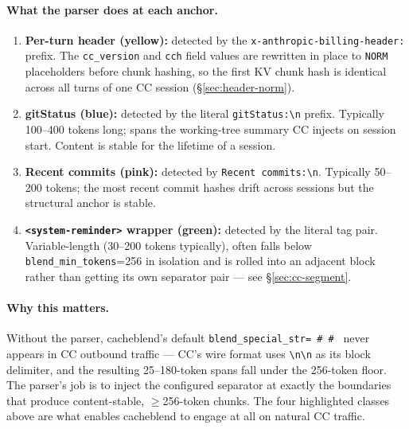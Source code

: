 \paragraph{What the parser does at each anchor.}
\begin{enumerate}
\item \textbf{Per-turn header (yellow):} detected by the
  \texttt{x-anthropic-\allowbreak{}billing-\allowbreak{}header:}
  prefix. The \texttt{cc\_version} and \texttt{cch} field values
  are rewritten
  in place to \texttt{NORM} placeholders before chunk hashing, so
  the first KV chunk hash is identical across all turns of one CC
  session (\S\ref{sec:header-norm}).
\item \textbf{gitStatus (blue):} detected by the literal
  \texttt{gitStatus:\textbackslash{}n} prefix. Typically 100--400
  tokens long; spans the working-tree summary CC injects on session
  start. Content is stable for the lifetime of a session.
\item \textbf{Recent commits (pink):} detected by
  \texttt{Recent commits:\textbackslash{}n}. Typically 50--200
  tokens; the most recent commit hashes drift across sessions but
  the structural anchor is stable.
\item \textbf{\texttt{<system-reminder>} wrapper (green):} detected
  by the literal tag pair. Variable-length (30--200 tokens
  typically), often falls below
  \texttt{blend\_min\_tokens}=256 in isolation and is rolled into
  an adjacent block rather than getting its own separator pair ---
  see \S\ref{sec:cc-segment}.
\end{enumerate}

\paragraph{Why this matters.} Without the parser, cacheblend's
default \texttt{blend\_special\_str=\textquotedbl{}~\#~\#~\textquotedbl{}}
never appears in CC outbound traffic --- CC's wire format uses
\texttt{\textbackslash{}n\textbackslash{}n} as its block delimiter,
and the resulting 25--180-token spans fall under the 256-token
floor. The parser's job is to inject the configured separator at
exactly the boundaries that produce content-stable, $\geq$256-token
chunks. The four highlighted classes above are what enables
cacheblend to engage at all on natural CC traffic.
